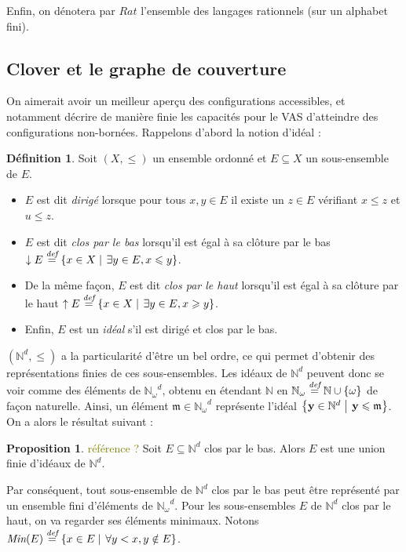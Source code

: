 \documentclass[a4paper,final]{article}
\theoremstyle{definition}
\newtheorem{Definition}[Theorem]{Définition}
\newtheorem{Proposition}[Theorem]{Proposition}
\let\leq\leqslant
\let\geq\geqslant
\newcommand{\lucas}[1]{\textcolor{olive}{#1}}
\newcommand{\set}[2]{\left\{#1\mathrel{\left|\vphantom{#1}\vphantom{#2}\right.}#2\right\}}
\newcommand{\os}[1]{\left\{\mathinner{#1}\right\}}
\newcommand{\defeq}{\ensuremath{\stackrel{\textit{def}}{=}}}
\let\union\cup
\newcommand{\Min}{\textit{Min}}
\newcommand{\N}{\ensuremath{\mathbb{N}}}
\newcommand{\Nomega}{\ensuremath{\mathbb{N}_\omega}}
\newcommand{\vect}[1]{\ensuremath{\mathbf{#1}}}
\begin{document}
Enfin, on dénotera par $Rat$ l'ensemble des langages rationnels (sur un alphabet fini).

\subsection{Clover et le graphe de couverture}

On aimerait avoir un meilleur aperçu des configurations accessibles, et notamment décrire de manière finie les capacités pour le VAS d'atteindre des configurations non-bornées.
Rappelons d'abord la notion d'idéal :

\begin{Definition}
Soit $(X,\leq)$ un ensemble ordonné et $E\subseteq X$ un sous-ensemble de $E$.
\begin{itemize}
    \item $E$ est dit \emph{dirigé} lorsque pour tous $x,y\in E$ il existe un $z\in E$ vérifiant $x\leq z$ et $u\leq z$.
    \item $E$ est dit \emph{clos par le bas} lorsqu'il est égal à sa clôture par le bas $\downarrow E \defeq \set{x\in X}{\exists y\in E, x\leq y}$.
    \item De la même façon, $E$ est dit \emph{clos par le haut} lorsqu'il est égal à sa clôture par le haut $\uparrow E \defeq \set{x\in X}{\exists y\in E, x \geq y}$.
    \item Enfin, $E$ est un \emph{idéal} s'il est dirigé et clos par le bas.
\end{itemize}
\end{Definition}

$(\N^d,\leq)$ a la particularité d'être un bel ordre, ce qui permet d'obtenir des représentations finies de ces sous-ensembles.
Les idéaux de $\N^d$ peuvent donc se voir comme des éléments de $\Nomega^d$, obtenu en étendant $\N$ en $\Nomega\defeq \N\union\os{\omega}$ de façon naturelle. %
Ainsi, un élément $\mathfrak{m}\in \Nomega^d$ représente l'idéal $\set{\vect{y}\in\N^d}{\vect{y} \leq \mathfrak{m}}$.
On a alors le résultat suivant :

\begin{Proposition}
\lucas{référence ?}
Soit $E \subseteq \N^d$ clos par le bas.
Alors $E$ est une union finie d'idéaux de $\N^d$.
\end{Proposition}

Par conséquent, tout sous-ensemble de $\N^d$ clos par le bas peut être représenté par un ensemble fini d'éléments de $\Nomega^d$.
Pour les sous-ensembles $E$ de $\N^d$ clos par le haut, on va regarder ses éléments minimaux.
Notons $\Min(E) \defeq \set{x\in E}{\forall y < x, y \notin E}$.
\end{document}
